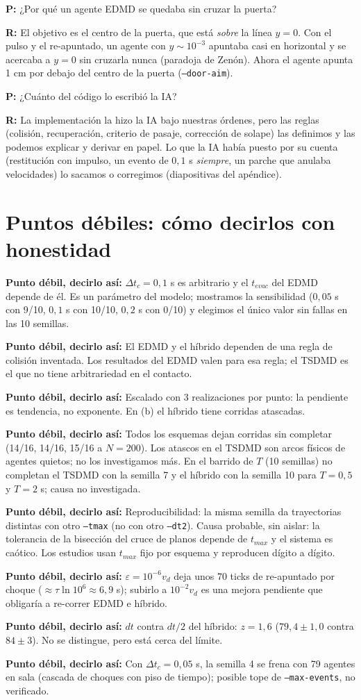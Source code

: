 \documentclass[10.5pt,a4paper]{article}
\newcommand{\debil}[1]{\par\colorbox{deb}{\parbox{\dimexpr\linewidth-2\fboxsep}{\textbf{Punto débil, decirlo así:} #1}}\par}
\newcommand{\pr}[1]{\par\textbf{P:} #1\par\nobreak}
\newcommand{\rp}[1]{\textbf{R:} #1\par}
\begin{document}
\pr{¿Por qué un agente EDMD se quedaba sin cruzar la puerta?}
\rp{El objetivo es el centro de la puerta, que está \emph{sobre} la línea $y=0$. Con el pulso y el re-apuntado, un agente con $y\sim10^{-3}$ apuntaba casi en horizontal y se acercaba a $y=0$ sin cruzarla nunca (paradoja de Zenón). Ahora el agente apunta 1 cm por debajo del centro de la puerta (\texttt{--door-aim}).}

\pr{¿Cuánto del código lo escribió la IA?}
\rp{La implementación la hizo la IA bajo nuestras órdenes, pero las reglas (colisión, recuperación, criterio de pasaje, corrección de solape) las definimos y las podemos explicar y derivar en papel. Lo que la IA había puesto por su cuenta (restitución con impulso, un evento de $0{,}1$ s \emph{siempre}, un parche que anulaba velocidades) lo sacamos o corregimos (diapositivas del apéndice).}

\section{Puntos débiles: cómo decirlos con honestidad}
\debil{$\Delta t_c=0{,}1$ s es arbitrario y el $t_{evac}$ del EDMD depende de él. Es un parámetro del modelo; mostramos la sensibilidad ($0{,}05$ s con 9/10, $0{,}1$ s con 10/10, $0{,}2$ s con 0/10) y elegimos el único valor sin fallas en las 10 semillas.}
\debil{El EDMD y el híbrido dependen de una regla de colisión inventada. Los resultados del EDMD valen para esa regla; el TSDMD es el que no tiene arbitrariedad en el contacto.}
\debil{Escalado con 3 realizaciones por punto: la pendiente es tendencia, no exponente. En (b) el híbrido tiene corridas atascadas.}
\debil{Todos los esquemas dejan corridas sin completar (14/16, 14/16, 15/16 a $N=200$). Los atascos en el TSDMD son arcos físicos de agentes quietos; no los investigamos más. En el barrido de $T$ (10 semillas) no completan el TSDMD con la semilla 7 y el híbrido con la semilla 10 para $T=0{,}5$ y $T=2$ s; causa no investigada.}
\debil{Reproducibilidad: la misma semilla da trayectorias distintas con otro \texttt{--tmax} (no con otro \texttt{--dt2}). Causa probable, sin aislar: la tolerancia de la bisección del cruce de planos depende de $t_{max}$ y el sistema es caótico. Los estudios usan $t_{max}$ fijo por esquema y reproducen dígito a dígito.}
\debil{$\varepsilon=10^{-6}v_d$ deja unos 70 ticks de re-apuntado por choque ($\approx\tau\ln10^6\approx6{,}9$ s); subirlo a $10^{-2}v_d$ es una mejora pendiente que obligaría a re-correr EDMD e híbrido.}
\debil{$dt$ contra $dt/2$ del híbrido: $z=1{,}6$ ($79{,}4\pm1{,}0$ contra $84\pm3$). No se distingue, pero está cerca del límite.}
\debil{Con $\Delta t_c=0{,}05$ s, la semilla 4 se frena con 79 agentes en sala (cascada de choques con piso de tiempo); posible tope de \texttt{--max-events}, no verificado.}
\end{document}
